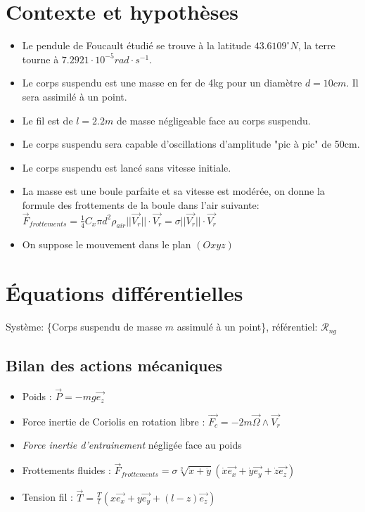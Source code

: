 \documentclass{article}
\begin{document}
	\section{Contexte et hypothèses}
	\begin{itemize}
		\itemsep 0em 
		\item Le pendule de Foucault étudié se trouve à la latitude $43.6109^{\circ}N$, la terre tourne à $7.2921\cdot 10^{-5}rad \cdot s^{-1}$.
		\item Le corps suspendu est une masse en fer de 4kg pour un diamètre $d=10cm$. Il sera assimilé à un point.
		\item Le fil est de $l = 2.2m$ de masse négligeable face au corps suspendu.
		\item Le corps suspendu sera capable d'oscillations d'amplitude "pic à pic" de 50cm.
		\item Le corps suspendu est lancé sans vitesse initiale.
		\item La masse est une boule parfaite et sa vitesse est modérée, on donne la formule des frottements de la boule dans l'air suivante: $\vec{F}_{frottements} = \frac{1}{4} C_x \pi d^2 \rho_{air} ||\vec{V_r}||\cdot\vec{V_r} = \sigma ||\vec{V_r}||\cdot\vec{V_r} $
		\item On suppose le mouvement dans le plan $(Oxyz)$
	\end{itemize}
	

	\section{Équations différentielles}
	Système: \{Corps suspendu de masse $m$ assimulé à un point\}, référentiel: $\mathcal{R}_{ng}$
	\subsection{Bilan des actions mécaniques} 
	\begin{itemize}
		\itemsep 0em 
		\item Poids : $\vec{P} = -mg\vec{e_z}$
		\item Force inertie de Coriolis en rotation libre : $\vec{F_c} = -2m\vec{\Omega}\wedge\vec{V_r}$
		\item \textit{Force inertie d'entrainement} négligée face au poids
		\item Frottements fluides : $\vec{F}_{frottements} = \sigma\sqrt[2]{\dot{x}+\dot{y}} (\dot{x}\vec{e_x}+\dot{y}\vec{e_y}+\dot{z}\vec{e_z})$
		\item Tension fil : $\vec{T} = \frac{T}{l}(x\vec{e_x}+y\vec{e_y}+(l-z)\vec{e_z}) $
	\end{itemize}
	
\end{document}
